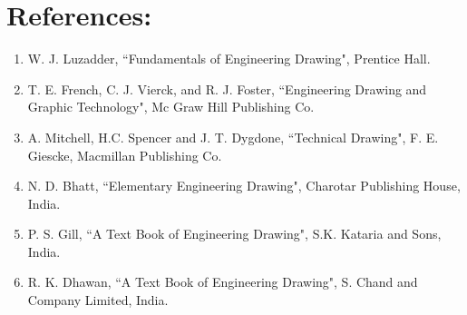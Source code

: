 \section*{References:}
\begin{enumerate}
   
    \item W. J. Luzadder, ``Fundamentals of Engineering Drawing", Prentice Hall.
    \item T. E. French, C. J. Vierck, and R. J. Foster, ``Engineering Drawing and Graphic Technology", Mc Graw Hill Publishing Co.
    \item A. Mitchell, H.C. Spencer and J. T. Dygdone, ``Technical Drawing", F. E. Giescke, Macmillan Publishing Co.
    \item N. D. Bhatt, ``Elementary Engineering Drawing", Charotar Publishing House, India.
    \item P. S. Gill, ``A Text Book of Engineering Drawing", S.K. Kataria and Sons, India.
    \item R. K. Dhawan, ``A Text Book of Engineering Drawing", S. Chand and Company Limited, India.
\end{enumerate}